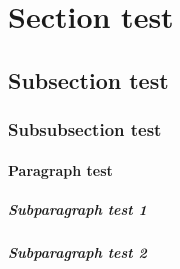 \documentclass{amsbook}
\begin{document}
\section{Section test}
\lipsum[1]

\subsection{Subsection test}
\lipsum[2]

\subsubsection{Subsubsection test}
\lipsum[3]

\paragraph{Paragraph test}
\lipsum[4]

\subparagraph{Subparagraph test 1}
\lipsum[5]

\subparagraph{Subparagraph test 2}

\lipsum[6]
\end{document}
